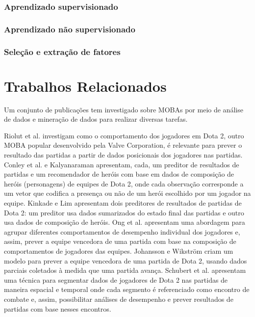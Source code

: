 \subsection{Aprendizado supervisionado}
\subsection{Aprendizado não supervisionado}
\subsection{Seleção e extração de fatores}

\chapter{Trabalhos Relacionados}

Um conjunto de publicações tem investigado sobre MOBAs por meio de análise de dados e mineração de dados para realizar diversas tarefas.

Riolut et al. \cite{rioult2014mining} investigam como o comportamento dos jogadores em Dota 2, outro MOBA popular desenvolvido pela Valve Corporation, é relevante para prever o resultado das partidas a partir de dados posicionais dos jogadores nas partidas. Conley et al. \cite{conley2013does} e Kalyanaraman \cite{kalyanaraman2014win} apresentam, cada, um preditor de resultados de partidas e um recomendador de heróis com base em dados de composição de heróis (personagens) de equipes de Dota 2, onde cada observação corresponde a um vetor que codifica a presença ou não de um herói escolhido por um jogador na equipe. Kinkade e Lim \cite{kinkade2015dota} apresentam dois preditores de resultados de partidas de Dota 2: um preditor usa dados sumarizados do estado final das partidas e outro usa dados de composição de heróis. Ong et al. \cite{ong2015player} apresentam uma abordagem para agrupar diferentes comportamentos de desempenho individual dos jogadores e, assim, prever a equipe vencedora de uma partida com base na composição de comportamentos de jogadores das equipes. Johansson e Wikstr\"om \cite {johansson2015result} criam um modelo para prever a equipe vencedora de uma partida de Dota 2, usando dados parciais coletados à medida que uma partida avança. Schubert et al. \cite{schubert2016esports} apresentam uma técnica para segmentar dados de jogadores de Dota 2 nas partidas de maneira espacial e temporal onde cada segmento é referenciado como encontro de combate e, assim, possibilitar análises de desempenho e prever resultados de partidas com base nesses encontros.

